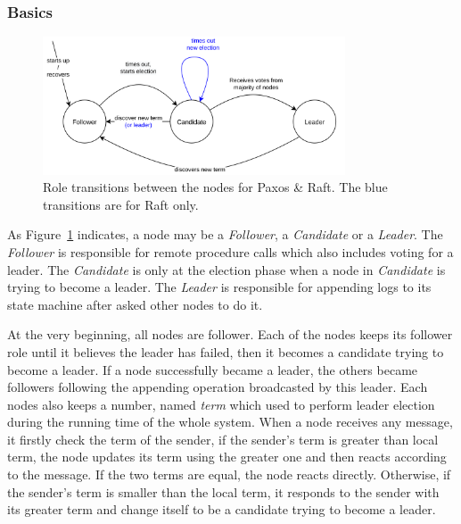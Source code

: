 \documentclass[12pt, a4paper]{article}
\begin{document}
\subsubsection{Basics}

\begin{figure}[htp]
\begin{center}
  \centering
  \includegraphics[width=0.8\textwidth]{img/roles-transitions.png}
  \caption{Role transitions between the nodes for Paxos \& Raft. The blue transitions are for Raft only.}
  \label{fig:roles-transitions}
\end{center}
\end{figure}
As Figure~\ref{fig:roles-transitions} indicates, a node may be a \textit{Follower},
a \textit{Candidate} or a \textit{Leader}.
The \textit{Follower} is responsible for
remote procedure calls which also includes voting for a leader.
The \textit{Candidate} is only at the election phase when a node in \textit{Candidate}
is trying to become a leader.
The \textit{Leader} is responsible for appending logs to its state machine after
asked other nodes to do it.

At the very beginning, all nodes are follower. Each of the nodes keeps its follower role
until it believes the leader has failed, then it becomes a candidate trying to become
a leader. If a node successfully became a leader, the others became followers following
the appending operation broadcasted by this leader.
Each nodes also keeps a number, named \textit{term} which used to perform leader election
during the running time of the whole system. When a node receives any message,
it firstly check the term of the sender, if the sender's term is greater than local term,
the node updates its term using the greater one and then reacts according to the message.
If the two terms are equal, the node reacts directly. Otherwise, if the sender's term
is smaller than the local term, it responds to the sender with its greater term and change
itself to be a candidate trying to become a leader.
\end{document}
